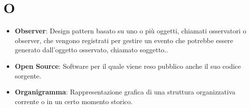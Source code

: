 \section*{O}
\begin{itemize}
	\item
	\textbf{Observer}: Design pattern basato su uno o più oggetti, chiamati osservatori o observer, che vengono registrati per gestire un evento che potrebbe essere generato dall'oggetto osservato, chiamato soggetto..
	\item
	\textbf{Open Source}: Software per il quale viene reso pubblico anche il suo codice sorgente.
	\item
	\textbf{Organigramma}: Rappresentazione grafica di una struttura organizzativa corrente o in un certo momento storico.
\end{itemize}
\newpage